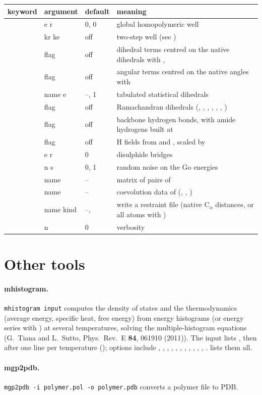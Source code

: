 \documentclass[11pt,a4paper]{article}
\newenvironment{keywords}
 {\begin{longtable}{>{\raggedright}p{0.2\textwidth}>{\raggedright}p{0.12\textwidth}>{\raggedright}p{0.14\textwidth}p{0.41\textwidth}}
  \toprule keyword & argument & default & meaning \\ \midrule \endhead
  \bottomrule \endfoot}
 {\end{longtable}}
\newcommand{\key}[4]{\kw{#1} & #2 & #3 & #4 \\}
\begin{document}
\begin{keywords}
\key{e_homo, r_homo}{e r}{0, 0}{global homopolymeric well}
\key{splice}{kr ke}{off}{two-step well (see \kw{[ global ]})}
\key{go_dihedrals}{flag}{off}{dihedral terms centred on the native dihedrals with \kw{e_dih1}, \kw{e_dih3}}
\key{go_angles}{flag}{off}{angular terms centred on the native angles with \kw{e_ang}}
\key{dihfile, e_dihtab}{name e}{--, 1}{tabulated statistical dihedrals}
\key{dih_ram}{flag}{off}{Ramachandran dihedrals (\kw{e_dihram}, \kw{sig_*}, \kw{phi_0_*}, \kw{psi_0_*}, \kw{dih_ka}, \kw{dih_kb}, \kw{propensityfile})}
\key{hb_backbone}{flag}{off}{backbone hydrogen bonds, with amide hydrogens built at \kw{hb_dist}}
\key{h_fields}{flag}{off}{H fields from \kw{h_fieldsfile} and \kw{maxcontfile}, scaled by \kw{hfs_alpha}}
\key{cys_e, cys_r}{e r}{0}{disulphide bridges}
\key{go_noise, go_nsigma}{n s}{0, 1}{random noise on the Go energies}
\key{pairsfile}{name}{--}{matrix of pairs of \kw{potential pairs}}
\key{coevofile}{name}{--}{coevolution data of \kw{potential coevo} (\kw{coevo_allatom}, \kw{contactfile}, \kw{maxcontpairsfile})}
\key{op_file, op_kind}{name kind}{--, \kw{GO_DIST_CA}}{write a restraint file (native C$_\alpha$ distances, or all atoms with \kw{GO_DIST_ALLATOM})}
\key{debug}{n}{0}{verbosity}
\end{keywords}

\section{Other tools}

\paragraph{mhistogram.} \texttt{mhistogram input} computes the density of
states and the thermodynamics (average energy, specific heat, free energy)
from energy histograms (or energy series with ) at several
temperatures, solving the multiple-histogram equations (G.~Tiana and
L.~Sutto, Phys.\ Rev.\ E \textbf{84}, 061910 (2011)). The input lists
, then after  one line per temperature
(); options include ,
, , , , ,
, , , , , .
 lists them all.

\paragraph{mgp2pdb.} \texttt{mgp2pdb -i polymer.pol -o polymer.pdb} converts a
polymer file to PDB.
\end{document}
